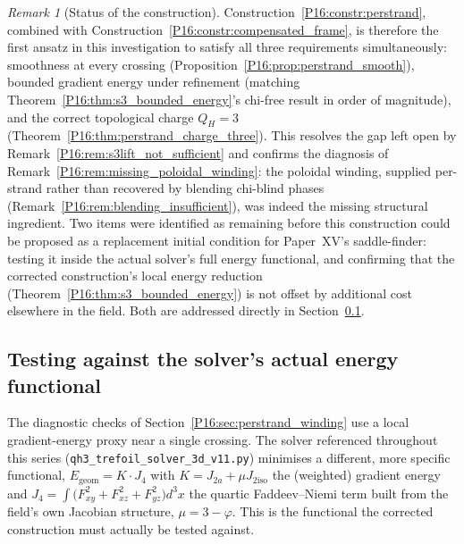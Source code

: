 \documentclass[11pt,a4paper]{article}
\theoremstyle{definition}\newtheorem{definition}[theorem]{Definition}
\theoremstyle{remark}
\newtheorem{remark}[theorem]{Remark}
\theoremstyle{definition}\newtheorem{construction}[theorem]{Construction}
\newcommand{\QH}{Q_H}
\begin{document}
\begin{remark}[Status of the construction]
\label{P16:rem:perstrand_summary}
Construction~\ref{P16:constr:perstrand}, combined with
Construction~\ref{P16:constr:compensated_frame}, is therefore the first
ansatz in this investigation to satisfy all three requirements
simultaneously: smoothness at every crossing
(Proposition~\ref{P16:prop:perstrand_smooth}), bounded gradient energy
under refinement (matching Theorem~\ref{P16:thm:s3_bounded_energy}'s
chi-free result in order of magnitude), and the correct topological
charge $\QH=3$ (Theorem~\ref{P16:thm:perstrand_charge_three}). This
resolves the gap left open by Remark~\ref{P16:rem:s3lift_not_sufficient}
and confirms the diagnosis of
Remark~\ref{P16:rem:missing_poloidal_winding}: the poloidal winding,
supplied per-strand rather than recovered by blending chi-blind
phases (Remark~\ref{P16:rem:blending_insufficient}), was indeed the
missing structural ingredient. Two items were identified as
remaining before this construction could be proposed as a replacement
initial condition for Paper~XV's saddle-finder: testing it inside the
actual solver's full energy functional, and confirming that the
corrected construction's local energy reduction
(Theorem~\ref{P16:thm:s3_bounded_energy}) is not offset by additional cost
elsewhere in the field. Both are addressed directly in
Section~\ref{P16:sec:solver_functional_test}.
\end{remark}

\subsection{Testing against the solver's actual energy functional}
\label{P16:sec:solver_functional_test}

The diagnostic checks of Section~\ref{P16:sec:perstrand_winding} use a
local gradient-energy proxy near a single crossing. The solver
referenced throughout this series (\texttt{qh3\_trefoil\_solver\_3d\_v11.py})
minimises a different, more specific functional,
$E_{\mathrm{geom}}=K\!\cdot\!J_4$ with $K=J_{2a}+\mu J_{2\mathrm{iso}}$
the (weighted) gradient energy and $J_4=\int\bigl(F_{xy}^2+F_{xz}^2+F_{yz}^2\bigr)d^3x$
the quartic Faddeev--Niemi term built from the field's own Jacobian
structure, $\mu=3-\varphi$. This is the functional the corrected
construction must actually be tested against.
\end{document}
